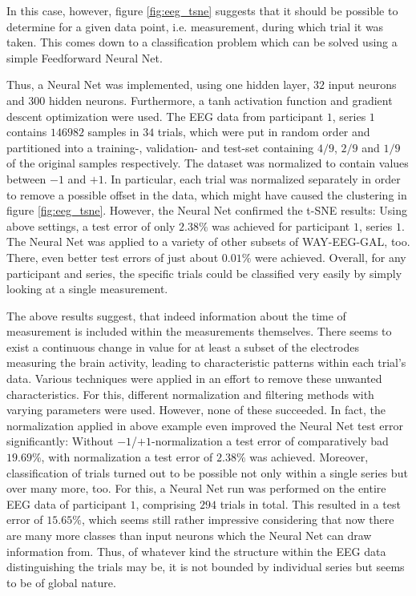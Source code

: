 \documentclass{article} %
\begin{document}
In this case, however, figure \ref{fig:eeg_tsne} suggests that it should be possible to determine for a given data point, i.e. measurement, during which trial it was taken. This comes down to a classification problem which can be solved using a simple Feedforward Neural Net.

Thus, a Neural Net was implemented, using one hidden layer, $32$ input neurons and $300$ hidden neurons. Furthermore, a tanh activation function and gradient descent optimization were used. The EEG data from participant $1$, series $1$ contains $146982$ samples in $34$ trials, which were put in random order and partitioned into a training-, validation- and test-set containing $4/9$, $2/9$ and $1/9$ of the original samples respectively. The dataset was normalized to contain values between $-1$ and $+1$. In particular, each trial was normalized separately in order to remove a possible offset in the data, which might have caused the clustering in figure \ref{fig:eeg_tsne}.
However, the Neural Net confirmed the t-SNE results: Using above settings, a test error of only $2.38\%$ was achieved for participant $1$, series $1$. The Neural Net was applied to a variety of other subsets of WAY-EEG-GAL, too. There, even better test errors of just about $0.01\%$ were achieved. Overall, for any participant and series, the specific trials could be classified very easily by simply looking at a single measurement.

The above results suggest, that indeed information about the time of measurement is included within the measurements themselves. There seems to exist a continuous change in value for at least a subset of the electrodes measuring the brain activity, leading to characteristic patterns within each trial's data. Various techniques were applied in an effort to remove these unwanted characteristics. For this, different normalization and filtering methods with varying parameters were used. However, none of these succeeded. In fact, the normalization applied in above example even improved the Neural Net test error significantly: Without $-1$/$+1$-normalization a test error of comparatively bad $19.69\%$, with normalization a test error of $2.38\%$ was achieved.
Moreover, classification of trials turned out to be possible not only within a single series but over many more, too. For this, a Neural Net run was performed on the entire EEG data of participant $1$, comprising $294$ trials in total. This resulted in a test error of $15.65\%$, which seems still rather impressive considering that now there are many more classes than input neurons which the Neural Net can draw information from.
Thus, of whatever kind the structure within the EEG data distinguishing the trials may be, it is not bounded by individual series but seems to be of global nature.
\end{document}
